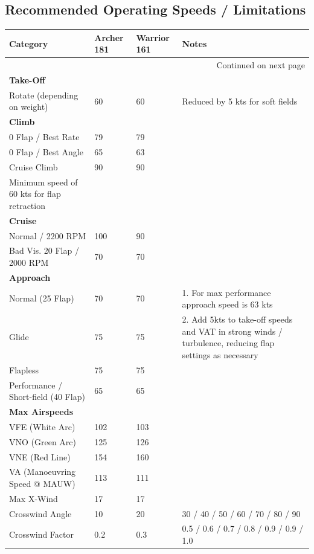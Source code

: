 \documentclass[a4paper]{article}
\begin{document}
\subsection*{Recommended Operating Speeds / Limitations}
\begin{longtable}{|p{3cm}|p{1.5cm}|p{1.5cm}|p{6cm}|}
\hline
\textbf{Category} & \textbf{Archer 181} & \textbf{Warrior 161} & \textbf{Notes} \\
\hline
\endhead
\hline
\multicolumn{4}{|r|}{{Continued on next page}} \\
\hline
\endfoot
\hline
\endlastfoot
\textbf{Take-Off} & & & \\
Rotate (depending on weight) & 60 & 60 & Reduced by 5 kts for soft fields \\
\textbf{Climb} & & & \\
0\textdegree{} Flap / Best Rate & 79 & 79 & \\
0\textdegree{} Flap / Best Angle & 65 & 63 & \\
Cruise Climb & 90 & 90 & \\
Minimum speed of 60 kts for flap retraction & & & \\
\textbf{Cruise} & & & \\
Normal / 2200 RPM & 100 & 90 & \\
Bad Vis. 20\textdegree{} Flap / 2000 RPM & 70 & 70 & \\
\textbf{Approach} & & & \\
Normal (25\textdegree{} Flap) & 70 & 70 & 1. For max performance approach speed is 63 kts \\
Glide & 75 & 75 & 2. Add 5kts to take-off speeds and VAT in strong winds / turbulence, reducing flap settings as necessary \\
Flapless & 75 & 75 & \\
Performance / Short-field (40\textdegree{} Flap) & 65 & 65 & \\
\textbf{Max Airspeeds} & & & \\
VFE (White Arc) & 102 & 103 & \\
VNO (Green Arc) & 125 & 126 & \\
VNE (Red Line) & 154 & 160 & \\
VA (Manoeuvring Speed @ MAUW) & 113 & 111 & \\
Max X-Wind & 17 & 17 & \\
Crosswind Angle & 10\textdegree{} & 20\textdegree{} & 30\textdegree{} / 40\textdegree{} / 50\textdegree{} / 60\textdegree{} / 70\textdegree{} / 80\textdegree{} / 90\textdegree{} \\
Crosswind Factor & 0.2 & 0.3 & 0.5 / 0.6 / 0.7 / 0.8 / 0.9 / 0.9 / 1.0 \\
\end{longtable}
\end{document}
